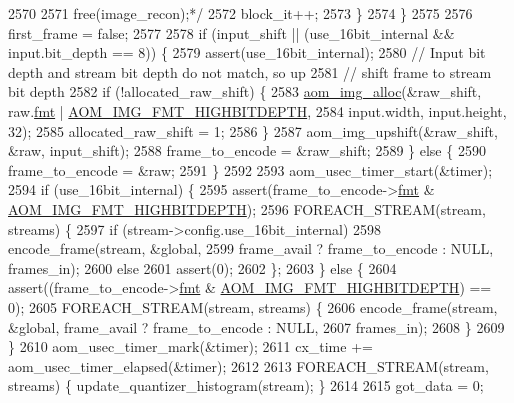 \begin{DoxyCodeInclude}
{{{{{{{{{{{{{{{{{{{{{{{{{{{{{{{{{{{{{{{{{{{{{{{{{{{{{{{{{{{{{{{{{{{{{{{{{2570 \textcolor{comment}{}
2571 \textcolor{comment}{            free(image\_recon);*/}
2572             block\_it++;
2573           \}
2574         \}
2575 
2576         first\_frame = \textcolor{keyword}{false};
2577 
2578         \textcolor{keywordflow}{if} (input\_shift || (use\_16bit\_internal && input.bit\_depth == 8)) \{
2579           assert(use\_16bit\_internal);
2580           \textcolor{comment}{// Input bit depth and stream bit depth do not match, so up}
2581           \textcolor{comment}{// shift frame to stream bit depth}
2582           \textcolor{keywordflow}{if} (!allocated\_raw\_shift) \{
2583             \hyperlink{aom__image_8h_a570db29fbd122951235a08fe9375f6bb}{aom\_img\_alloc}(&raw\_shift, raw.\hyperlink{structaom__image_a6c64b1ab918d80d52eb8f5d6d957e825}{fmt} | 
      \hyperlink{aom__image_8h_a607b37d91f75442f54223ecd85f1b6cb}{AOM\_IMG\_FMT\_HIGHBITDEPTH},
2584                 input.width, input.height, 32);
2585             allocated\_raw\_shift = 1;
2586           \}
2587           aom\_img\_upshift(&raw\_shift, &raw, input\_shift);
2588           frame\_to\_encode = &raw\_shift;
2589         \} \textcolor{keywordflow}{else} \{
2590           frame\_to\_encode = &raw;
2591         \}
2592 
2593         aom\_usec\_timer\_start(&timer);
2594         \textcolor{keywordflow}{if} (use\_16bit\_internal) \{
2595           assert(frame\_to\_encode->\hyperlink{structaom__image_a6c64b1ab918d80d52eb8f5d6d957e825}{fmt} & \hyperlink{aom__image_8h_a607b37d91f75442f54223ecd85f1b6cb}{AOM\_IMG\_FMT\_HIGHBITDEPTH});
2596           FOREACH\_STREAM(stream, streams) \{
2597             \textcolor{keywordflow}{if} (stream->config.use\_16bit\_internal)
2598               encode\_frame(stream, &global,
2599                   frame\_avail ? frame\_to\_encode : NULL, frames\_in);
2600             \textcolor{keywordflow}{else}
2601               assert(0);
2602           \};
2603         \} \textcolor{keywordflow}{else} \{
2604           assert((frame\_to\_encode->\hyperlink{structaom__image_a6c64b1ab918d80d52eb8f5d6d957e825}{fmt} & \hyperlink{aom__image_8h_a607b37d91f75442f54223ecd85f1b6cb}{AOM\_IMG\_FMT\_HIGHBITDEPTH}) == 0);
2605           FOREACH\_STREAM(stream, streams) \{
2606             encode\_frame(stream, &global, frame\_avail ? frame\_to\_encode : NULL,
2607                 frames\_in);
2608           \}
2609         \}
2610         aom\_usec\_timer\_mark(&timer);
2611         cx\_time += aom\_usec\_timer\_elapsed(&timer);
2612 
2613         FOREACH\_STREAM(stream, streams) \{ update\_quantizer\_histogram(stream); \}
2614 
2615         got\_data = 0;
}}}}}}}}}}}}}}}}}}}}}}}}}}}}}}}}}}}}}}}}}}}}}}}}}}}}}}}}}}}}}}}}}}}}}}}}}
\end{DoxyCodeInclude}
